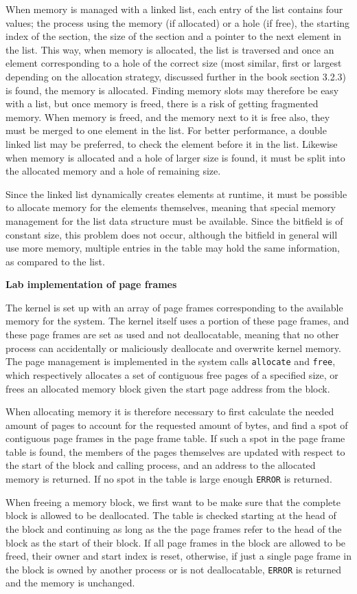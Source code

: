 When memory is managed with a linked list, each entry of the list contains four values; the process using the memory (if allocated) or a hole (if free), the starting index of the section, the size of the section and a pointer to the next element in the list. This way, when memory is allocated, the list is traversed and once an element corresponding to a hole of the correct size (most similar, first or largest depending on the allocation strategy, discussed further in the book \cite{tanembaum} section 3.2.3) is found, the memory is allocated. Finding memory slots may therefore be easy with a list, but once memory is freed, there is a risk of getting fragmented memory. When memory is freed, and the memory next to it is free also, they must be merged to one element in the list. For better performance, a double linked list may be preferred, to check the element before it in the list. Likewise when memory is allocated and a hole of larger size is found, it must be split into the allocated memory and a hole of remaining size.

Since the linked list dynamically creates elements at runtime, it must be possible to allocate memory for the elements themselves, meaning that special memory management for the list data structure must be available. Since the bitfield is of constant size, this problem does not occur, although the bitfield in general will use more memory, multiple entries in the table may hold the same information, as compared to the list.

\textbf{Lab implementation of page frames}

The kernel is set up with an array of page frames corresponding to the available memory for the system. The kernel itself uses a portion of these page frames, and these page frames are set as used and not deallocatable, meaning that no other process can accidentally or maliciously deallocate and overwrite kernel memory. The page management is implemented in the system calls \texttt{allocate} and \texttt{free}, which respectively allocates a set of contiguous free pages of a specified size, or frees an allocated memory block given the start page address from the block.

When allocating memory it is therefore necessary to first calculate the needed amount of pages to account for the requested amount of bytes, and find a spot of contiguous page frames in the page frame table. If such a spot in the page frame table is found, the members of the pages themselves are updated with respect to the start of the block and calling process, and an address to the allocated memory is returned. If no spot in the table is large enough \texttt{ERROR} is returned.

When freeing a memory block, we first want to be make sure that the complete block is allowed to be deallocated. The table is checked starting at the head of the block and continuing as long as the the page frames refer to the head of the block as the start of their block. If all page frames in the block are allowed to be freed, their owner and start index is reset, otherwise, if just a single page frame in the block is owned by another process or is not deallocatable, \texttt{ERROR} is returned and the memory is unchanged.